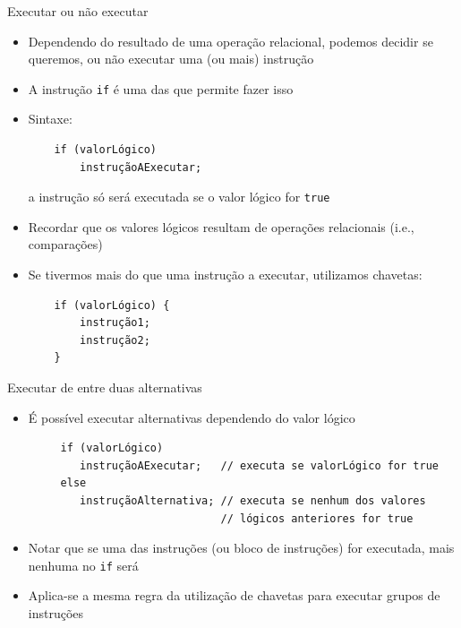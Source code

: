 \documentclass[portuguese, aspectratio=169, xcolor=table]{beamer}
\begin{document}
\begin{frame}[fragile]{Executar ou não executar}
\begin{itemize}
    \item Dependendo do resultado de uma operação relacional, podemos decidir se queremos, ou não executar uma (ou mais) instrução
    \item A instrução \texttt{if} é uma das que permite fazer isso
    \item Sintaxe:
\begin{verbatim}
    if (valorLógico)
        instruçãoAExecutar;
\end{verbatim}
a instrução só será executada se o valor lógico for \texttt{true}
\item Recordar que os valores lógicos resultam de operações relacionais (i.e., comparações)
\item Se tivermos mais do que uma instrução a executar, utilizamos chavetas:
    \begin{verbatim}
    if (valorLógico) {
        instrução1;
        instrução2;
    }
\end{verbatim}
\end{itemize}
\end{frame}


\begin{frame}[fragile]{Executar de entre duas alternativas}
\begin{itemize}
    \item É possível executar alternativas dependendo do valor lógico
    \begin{verbatim}
     if (valorLógico)
        instruçãoAExecutar;   // executa se valorLógico for true
     else
        instruçãoAlternativa; // executa se nenhum dos valores
                              // lógicos anteriores for true
    \end{verbatim}
\item Notar que se uma das instruções (ou bloco de instruções) for executada, mais nenhuma no \texttt{if} será
\item Aplica-se a mesma regra da utilização de chavetas para executar grupos de instruções
\end{itemize}
\end{frame}
\end{document}
